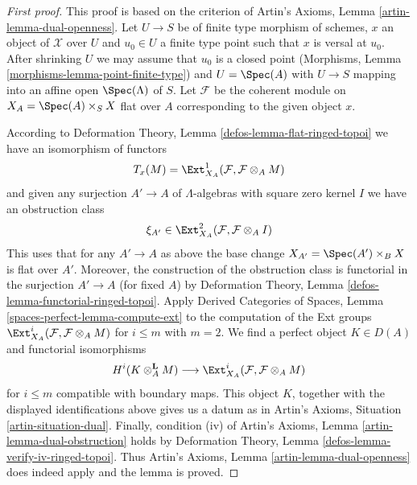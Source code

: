 \begin{proof}[First proof]
This proof is based on the criterion of
Artin's Axioms, Lemma \ref{artin-lemma-dual-openness}.
Let $U \to S$ be of finite type morphism of schemes, $x$ an object of
$\mathcal{X}$ over $U$ and $u_0 \in U$ a finite type point such that
$x$ is versal at $u_0$. After shrinking $U$ we may assume that $u_0$
is a closed point (Morphisms, Lemma \ref{morphisms-lemma-point-finite-type})
and $U = \Spec(A)$ with $U \to S$ mapping into an
affine open $\Spec(\Lambda)$ of $S$.
Let $\mathcal{F}$ be the coherent module on $X_A = \Spec(A) \times_S X$
flat over $A$ corresponding to the given object $x$.

\medskip\noindent
According to Deformation Theory, Lemma \ref{defos-lemma-flat-ringed-topoi}
we have an isomorphism of functors
$$
T_x(M) = \Ext^1_{X_A}(\mathcal{F}, \mathcal{F} \otimes_A M)
$$
and given any surjection $A' \to A$ of $\Lambda$-algebras with square zero
kernel $I$ we have an obstruction class
$$
\xi_{A'} \in \Ext^2_{X_A}(\mathcal{F}, \mathcal{F} \otimes_A I)
$$
This uses that for any $A' \to A$ as above the base change
$X_{A'} = \Spec(A') \times_B X$ is flat over $A'$.
Moreover, the construction of the obstruction class is functorial
in the surjection $A' \to A$ (for fixed $A$) by
Deformation Theory, Lemma \ref{defos-lemma-functorial-ringed-topoi}.
Apply Derived Categories of Spaces, Lemma
\ref{spaces-perfect-lemma-compute-ext}
to the computation of the Ext groups
$\Ext^i_{X_A}(\mathcal{F}, \mathcal{F} \otimes_A M)$
for $i \leq m$ with $m = 2$. We find a perfect object $K \in D(A)$
and functorial isomorphisms
$$
H^i(K \otimes_A^\mathbf{L} M)
\longrightarrow
\Ext^i_{X_A}(\mathcal{F}, \mathcal{F} \otimes_A M)
$$
for $i \leq m$ compatible with boundary maps. This object $K$, together
with the displayed identifications above gives us a datum as in
Artin's Axioms, Situation \ref{artin-situation-dual}.
Finally, condition (iv) of
Artin's Axioms, Lemma \ref{artin-lemma-dual-obstruction}
holds by
Deformation Theory, Lemma \ref{defos-lemma-verify-iv-ringed-topoi}.
Thus Artin's Axioms, Lemma \ref{artin-lemma-dual-openness}
does indeed apply and the lemma is proved.
\end{proof}

